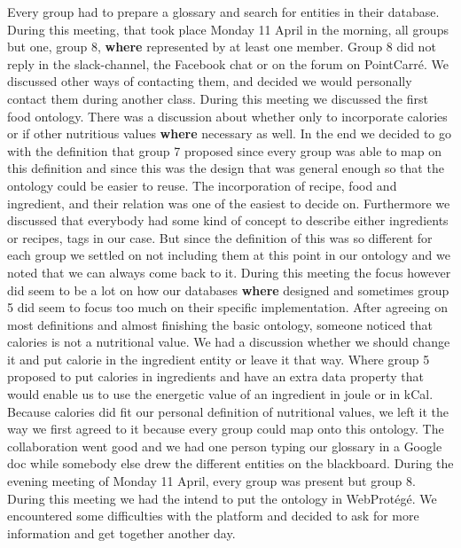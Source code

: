 Every group had to prepare a glossary and search for entities in their database. During this meeting, that took place Monday 11 April in the morning, all groups but one, group 8, \textbf{where} represented by at least one member. Group 8 did not reply in the slack-channel, the Facebook chat or on the forum on PointCarr\'e. We discussed other ways of contacting them, and decided we would personally contact them during another class. During this meeting we discussed the first food ontology. There was a discussion about whether only to incorporate calories or if other nutritious values \textbf{where} necessary as well. In the end we decided to go with the definition that group 7 proposed since every group was able to map on this definition and since this was the design that was general enough so that the ontology could be easier to reuse. The incorporation of recipe, food and ingredient, and their relation was one of the easiest to decide on. Furthermore we discussed that everybody had some kind of concept to describe either ingredients or recipes, tags in our case. But since the definition of this was so different for each group we settled on not including them at this point in our ontology and we noted that we can always come back to it. During this meeting the focus however did seem to be a lot on how our databases \textbf{where} designed and sometimes group 5 did seem to focus too much on their specific implementation. After agreeing on most definitions and almost finishing the basic ontology, someone noticed that calories is not a nutritional value. We had a discussion whether we should change it and put calorie in the ingredient entity or leave it that way. Where group 5 proposed to put calories in ingredients and have an extra data property that would enable us to use the energetic value of an ingredient in joule or in kCal. Because calories did fit our personal definition of nutritional values, we left it the way we first agreed to it because every group could map onto this ontology. The collaboration went good and we had one person typing our glossary in a Google doc while somebody else drew the different entities on the blackboard. 
\newline
\newline
\noindent
During the evening meeting of Monday 11 April, every group was present but group 8. During this meeting we had the intend to put the ontology in  WebProtégé. We encountered some difficulties with the platform and decided to ask for more information and get together another day. 
\newline
